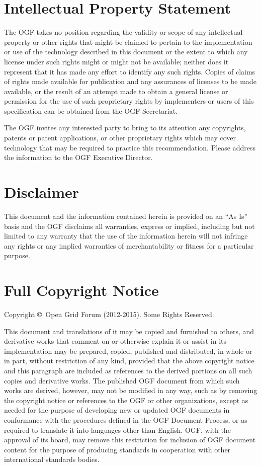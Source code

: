 \documentclass{article}
\newcommand{\copyrightyears}{2012-2015}
\begin{document}
\section{Intellectual Property Statement}

 The OGF takes no position regarding the validity or scope of any
 intellectual property or other rights that might be claimed to
 pertain to the implementation or use of the technology described in
 this document or the extent to which any license under such rights
 might or might not be available; neither does it represent that it
 has made any effort to identify any such rights.  Copies of claims of
 rights made available for publication and any assurances of licenses
 to be made available, or the result of an attempt made to obtain a
 general license or permission for the use of such proprietary rights
 by implementers or users of this specification can be obtained from
 the OGF Secretariat.

 The OGF invites any interested party to bring to its attention any
 copyrights, patents or patent applications, or other proprietary
 rights which may cover technology that may be required to practice
 this recommendation.  Please address the information to the OGF
 Executive Director.


\section{Disclaimer}

 This document and the information contained herein is provided on an
 ``As Is'' basis and the OGF disclaims all warranties, express or
 implied, including but not limited to any warranty that the use of
 the information herein will not infringe any rights or any implied
 warranties of merchantability or fitness for a particular purpose.


\section{Full Copyright Notice}

 Copyright \copyright \ Open Grid Forum (\copyrightyears). Some Rights
 Reserved.

 This document and translations of it may be copied and furnished to
 others, and derivative works that comment on or otherwise explain it
 or assist in its implementation may be prepared, copied, published
 and distributed, in whole or in part, without restriction of any
 kind, provided that the above copyright notice and this paragraph are
 included as references to the derived portions on all such copies and
 derivative works. The published OGF document from which such works
 are derived, however, may not be modified in any way, such as by
 removing the copyright notice or references to the OGF or other
 organizations, except as needed for the purpose of developing new or
 updated OGF documents in conformance with the procedures defined in
 the OGF Document Process, or as required to translate it into
 languages other than English. OGF, with the approval of its board,
 may remove this restriction for inclusion of OGF document content for
 the purpose of producing standards in cooperation with other
 international standards bodies.
\end{document}
